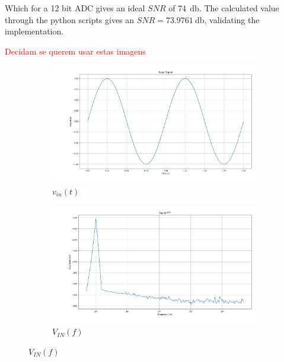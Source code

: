 Which for a 12 bit ADC gives an ideal $SNR$ of $74~~\si{\decibel}$. The calculated value through the python scripts gives an $SNR = 73.9761~\si{\decibel}$, validating the implementation.

\textcolor{red}{Decidam se querem usar estas imagens}

\begin{figure}[H]
    \centering

    \begin{subfigure}[b]{0.4\textwidth}
        \centering
        \includegraphics[width=\textwidth]{Images/Vin_tempo_ideal.png}
        \caption{$v_{in}(t)$}
        \label{fig:Vin_tempo_ideal}
    \end{subfigure}%
    \begin{subfigure}[b]{0.4\textwidth}
        \centering
        \includegraphics[width=\textwidth]{Images/Vin_ideal.png}
        \caption{$V_{IN}(f)$}
        \label{fig:Vin_freq_ideal}
    \end{subfigure}


\end{figure}
